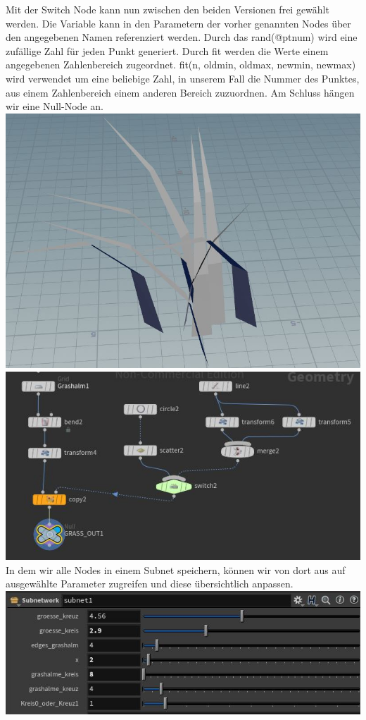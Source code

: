 \documentclass[paper=a4,fontsize=12pt,ngerman]{scrartcl}
\begin{document}
\begin{enumerate}
\begin{itemize}
\begin{minipage}{0.5\textwidth}
			 \end{minipage} 
		\end{itemize}

		Mit der Switch Node kann nun zwischen den beiden Versionen frei gewählt werden. 
		Die Variable kann in den Parametern der vorher genannten Nodes über den angegebenen Namen referenziert werden. Durch das rand(@ptnum) wird eine zufällige Zahl für jeden Punkt generiert. Durch fit werden die Werte einem angegebenen Zahlenbereich zugeordnet. fit(n, oldmin, oldmax, newmin, newmax) wird verwendet um eine beliebige Zahl, in unserem Fall die Nummer des Punktes, aus einem Zahlenbereich einem anderen Bereich zuzuordnen. Am Schluss hängen wir eine Null-Node an. \\
		\includegraphics*[scale=0.3]{graphics/grass_final.jpg}
		\includegraphics*[scale=0.53]{graphics/grass_1.jpg}\\
		In dem wir alle Nodes in einem Subnet speichern, können wir von dort aus auf ausgewählte Parameter zugreifen und diese übersichtlich anpassen.\\
		\includegraphics*[width=\textwidth]{graphics/subnet.jpg}
	\end{enumerate}
	
\end{document}
